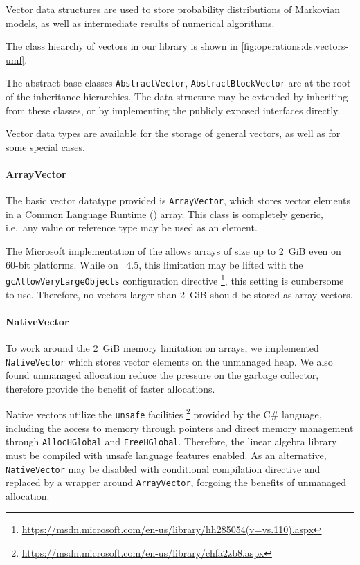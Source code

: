 Vector data structures are used to store probability distributions of
Markovian models, as well as intermediate results of numerical
algorithms.

The class hiearchy of vectors in our library is shown in
\cref{fig:operations:ds:vectors-uml}.

The abstract base classes \texttt{AbstractVector},
\texttt{AbstractBlockVector} are at the root of the inheritance
hierarchies. The data structure may be extended by inheriting from
these classes, or by implementing the publicly exposed interfaces
directly.

Vector data types are available for the storage of general vectors, as
well as for some special cases.

\paragraph{ArrayVector}

The basic vector datatype provided is \texttt{ArrayVector}, which
stores vector elements in a Common Language Runtime ()
array. This class is completely generic, i.e.~any  value or
reference type may be used as an element.

The Microsoft  implementation of the  allows
arrays of size up to 2~GiB even on 60-bit platforms. While on
~4.5, this limitation may be lifted with the
\texttt{gcAllowVeryLargeObjects} configuration directive%
\footnote{\url{https://msdn.microsoft.com/en-us/library/hh285054(v=vs.110).aspx}},
this setting is cumbersome to use. Therefore, no vectors larger than
2~GiB should be stored as array vectors.

\paragraph{NativeVector}

To work around the 2~GiB memory limitation on  arrays, we
implemented \texttt{NativeVector} which stores vector elements on the
unmanaged heap. We also found unmanaged allocation reduce the pressure
on the garbage collector, therefore provide the benefit of faster
allocations.

Native vectors utilize the \texttt{unsafe} facilities%
\footnote{\url{https://msdn.microsoft.com/en-us/library/chfa2zb8.aspx}}
provided by the C\# language, including the access to memory through
pointers and direct memory management through \texttt{AllocHGlobal}
and \texttt{FreeHGlobal}. Therefore, the linear algebra library must
be compiled with unsafe language features enabled. As an alternative,
\texttt{NativeVector} may be disabled with conditional compilation
directive and replaced by a wrapper around \texttt{ArrayVector},
forgoing the benefits of unmanaged allocation.

